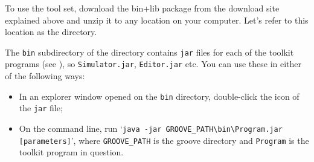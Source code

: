 To use the \GROOVE tool set, download the bin+lib package from the download
site explained above and unzip it to any location on your computer. Let's refer
to this location as the \GROOVE directory.

The \texttt{bin} subdirectory of the \GROOVE directory contains \texttt{jar}
files for each of the toolkit programs (see ), so
\texttt{Simulator.jar}, \texttt{Editor.jar} etc. You can use these in either of
the following ways:
\begin{itemize}
\item In an explorer window opened on the \texttt{bin} directory, double-click
  the icon of the \texttt{jar} file;
\item On the command line, run %
  `\verb|java -jar GROOVE_PATH\bin\Program.jar [parameters]|', %
  where \texttt{GROOVE\_PATH} is the groove directory and \texttt{Program} is
  the toolkit program in question.
\end{itemize}
